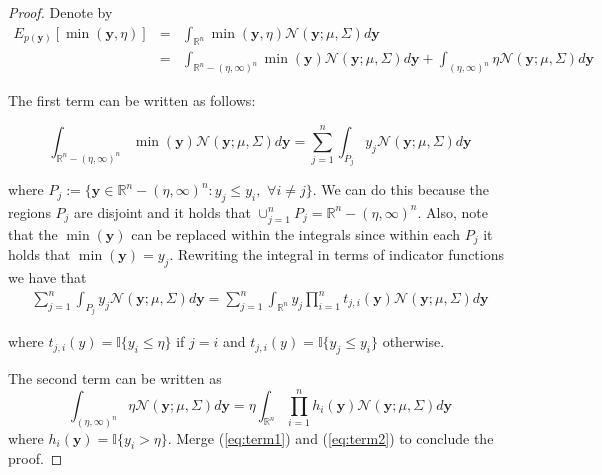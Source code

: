 \documentclass[twoside]{article}
\newcommand{\by}{\textbf{y}}
\newcommand{\N}{\mathcal{N}}
\newcommand{\IR}{\mathbb{R}}
\newtheorem{proof}{Proof}
\begin{document}
\begin{proof}
Denote by 
\begin{eqnarray}\nonumber
E_{p(\by)} [\min (\by,\eta)] & = & \int_{\IR^n} \min (\by,\eta)  \N(\by; \mu, \Sigma) d\by\\ \nonumber
& = & \int_{\IR^n - (\eta,\infty)^n } \min (\by)  \N(\by; \mu, \Sigma) d\by + \int_{(\eta,\infty)^n} \eta  \N(\by; \mu, \Sigma) d\by  \nonumber
\end{eqnarray}

The first term can be written as follows:

\begin{equation}
 \int_{\IR^n - (\eta,\infty)^n } \min (\by)  \N(\by; \mu, \Sigma) d\by  =    \sum_{j=1}^n \int_{P_j} y_j \N(\by; \mu, \Sigma) d \by \nonumber
\end{equation}\nonumber

where $P_j := \{ \by \in\IR^n - (\eta,\infty)^n  : y_j \leq y_i,\,\, \forall i \neq j \}$. We can do this because the regions $P_j$ are disjoint and it holds that $\cup_{j=1}^{n}P_j = \IR^n - (\eta,\infty)^n $.  Also, note that the $\min(\by)$ can be replaced within the integrals since within each $P_j$ it holds that $\min(\by) = y_j$. Rewriting the integral in terms of indicator functions we have that
\begin{eqnarray}\label{eq:term1}
 \sum_{j=1}^n \int_{P_j} y_j \N(\by; \mu, \Sigma) d \by   =  \sum_{j=1}^n  \int_{\IR^n} y_j \prod_{i=1}^n t_{j,i}(\by) \N(\by; \mu, \Sigma) d \by 
\end{eqnarray}

where $t_{j,i}(y) =\mathbb{I}\{y_i \leq\eta\}$ if $j=i$ and $t_{j,i}(y) =\mathbb{I}\{y_j \leq y_i \}$ otherwise.

The second term can be written as
\begin{equation}\label{eq:term2}
 \int_{(\eta,\infty)^n } \eta  \N(\by; \mu, \Sigma) d\by = \eta\int_{\IR^n} \prod_{i=1}^nh_i(\by) \N(\by; \mu, \Sigma) d\by
\end{equation}
where $h_i(\by) = \mathbb{I}\{y_i>\eta\}$.  Merge (\ref{eq:term1}) and (\ref{eq:term2}) to conclude the proof.
 
\end{proof}
\end{document}

